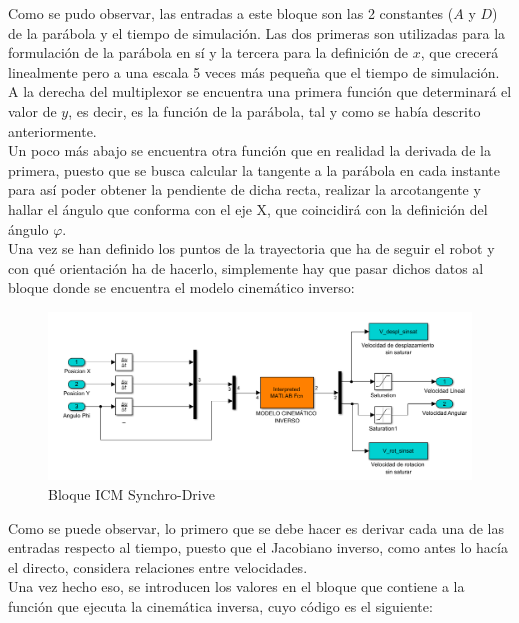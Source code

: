 \documentclass[a4paper,twoside]{article}
\begin{document}
	Como se pudo observar, las entradas a este bloque son las 2 constantes ($A$ y $D$) de la parábola y el tiempo de simulación. Las dos primeras son utilizadas para la formulación de la parábola en sí y la tercera para la definición de $x$, que crecerá linealmente pero a una escala 5 veces más pequeña que el tiempo de simulación.\\
	
	A la derecha del multiplexor se encuentra una primera función que determinará el valor de $y$, es decir, es la función de la parábola, tal y como se había descrito anteriormente.\\
	
	Un poco más abajo se encuentra otra función que en realidad la derivada de la primera, puesto que se busca calcular la tangente a la parábola en cada instante para así poder obtener la pendiente de dicha recta, realizar la arcotangente y hallar el ángulo que conforma con el eje X, que coincidirá con la definición del ángulo $\varphi$.\\
	
	Una vez se han definido los puntos de la trayectoria que ha de seguir el robot y con qué orientación ha de hacerlo, simplemente hay que pasar dichos datos al bloque donde se encuentra el modelo cinemático inverso:
	
	\begin{figure}[H]
		\centering
		\includegraphics[width=1\textwidth]{simulink_MCI_3}
		\caption{Bloque ICM Synchro-Drive}
	\end{figure}

	Como se puede observar, lo primero que se debe hacer es derivar cada una de las entradas respecto al tiempo, puesto que el Jacobiano inverso, como antes lo hacía el directo, considera relaciones entre velocidades.\\
	
	Una vez hecho eso, se introducen los valores en el bloque que contiene a la función que ejecuta la cinemática inversa, cuyo código es el siguiente:
	
\end{document}
